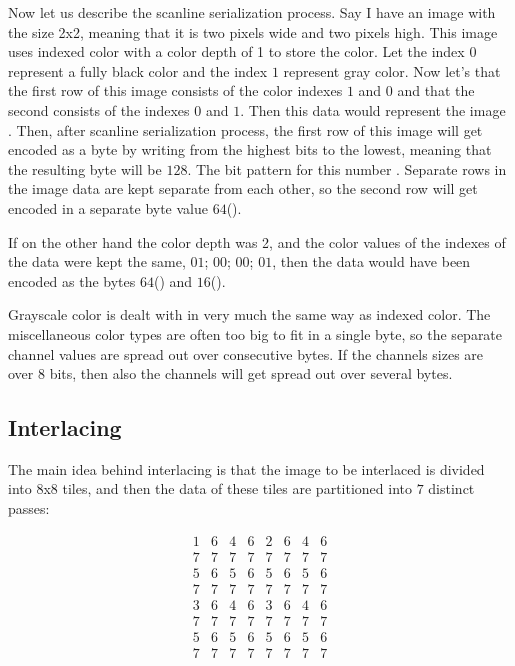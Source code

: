 Now let us describe the scanline serialization process. Say I have an
image with the size 2x2, meaning that it is two pixels wide and two
pixels high. This image uses indexed color with a color depth of 1 to
store the color. Let the index $0$ represent a fully black color and
the index $1$ represent gray color. Now let's that the first row of
this image consists of the color indexes $1$ and $0$ and that the
second consists of the indexes $0$ and $1$. Then this data would
represent the image \checkerimg. Then, after scanline serialization
process, the first row of this image will get encoded as a byte by
writing from the highest bits to the lowest, meaning that the
resulting byte will be $128$. The bit pattern for this number
. Separate rows in the image data are kept
separate from each other, so the second row will get encoded in a
separate byte value $64$().

If on the other hand the color depth was 2, and the color values of
the indexes of the data were kept the same, $01$; $00$; $00$; $01$,
then the data would have been encoded as the bytes
$64$() and $16$().

Grayscale color is dealt with in very much the same way as indexed
color. The miscellaneous color types are often too big to fit in a
single byte, so the separate channel values are spread out over
consecutive bytes. If the channels sizes are over 8 bits, then also
the channels will get spread out over several bytes.

\subsection{Interlacing}
\label{png-interlacing}

The main idea behind \png interlacing is that the image to be
interlaced is divided into 8x8 tiles, and then the data of these tiles
are partitioned into $7$ distinct passes:

\[
\begin{matrix}
  1 & 6 & 4 & 6 & 2 & 6 & 4 & 6\\
  7 & 7 & 7 & 7 & 7 & 7 & 7 & 7\\
  5 & 6 & 5 & 6 & 5 & 6 & 5 & 6\\
  7 & 7 & 7 & 7 & 7 & 7 & 7 & 7\\
  3 & 6 & 4 & 6 & 3 & 6 & 4 & 6\\
  7 & 7 & 7 & 7 & 7 & 7 & 7 & 7\\
  5 & 6 & 5 & 6 & 5 & 6 & 5 & 6\\
  7 & 7 & 7 & 7 & 7 & 7 & 7 & 7\\
\end{matrix}
\]

